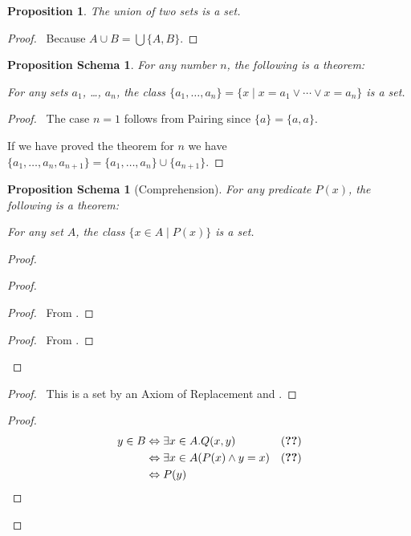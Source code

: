 \documentclass{book}
\let\qed\relax
\newtheorem{prop}[ax]{Proposition}
\newtheorem{props}[ax]{Proposition Schema}
\theoremstyle{definition}
\begin{document}
\begin{prop}
The union of two sets is a set.
\end{prop}

\begin{proof}
\pf\ Because $A \cup B = \bigcup \{A,B\}$. \qed
\end{proof}

\begin{props}
For any number $n$, the following is a theorem:

For any sets $a_1$, \ldots, $a_n$, the class $\{a_1, \ldots, a_n\} = \{x \mid x = a_1 \vee \cdots \vee x = a_n\}$ is a set.
\end{props}

\begin{proof}
\pf\ The case $n=1$ follows from Pairing since $\{a\} = \{a,a\}$.

If we have proved the theorem for $n$ we have $\{a_1, \ldots, a_n, a_{n+1}\} = \{a_1, \ldots, a_n\} \cup \{a_{n+1}\}$. \qed
\end{proof}

\begin{props}[Comprehension]
For any predicate $P(x)$, the following is a theorem:

For any set $A$, the class $\{x \in A \mid P(x)\}$ is a set.
\end{props}

\begin{proof}
\pf
{}
\begin{proof}
	\begin{proof}
		\pf\ From .
	\end{proof}
	\begin{proof}
		\pf\ From .
	\end{proof}
\end{proof}
\begin{proof}
	\pf\ This is a set by an Axiom of Replacement and .
\end{proof}
\begin{proof}
	\pf
	\begin{align*}
		y \in B & \Leftrightarrow \exists x \in A. Q(x,y) & (\text{\stepref{4}}) \\
		& \Leftrightarrow \exists x \in A (P(x) \wedge y = x) & (\text{\stepref{2}}) \\
		& \Leftrightarrow P(y)
	\end{align*}
\end{proof}
\qed
\end{proof}
\end{document}
